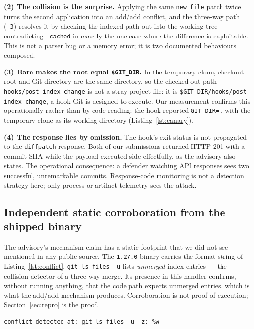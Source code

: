 \textbf{(2) The collision is the surprise.} Applying the same
\texttt{new file} patch twice turns the second application into an add/add
conflict, and the three-way path (\texttt{-3}) resolves it by checking the
indexed path out into the working tree --- contradicting \texttt{--cached} in
exactly the one case where the difference is exploitable. This is not a parser
bug or a memory error; it is two documented behaviours composed.

\textbf{(3) Bare makes the root equal \texttt{\$GIT\_DIR}.} In the temporary
clone, checkout root and Git directory are the same directory, so the
checked-out path \texttt{hooks/post-index-change} is not a stray project file:
it is \texttt{\$GIT\_DIR/hooks/post-index-change}, a hook Git is designed to
execute. Our measurement confirms this operationally rather than by code
reading: the hook reported \texttt{GIT\_DIR=.} with the temporary clone as its
working directory (Listing~\ref{lst:canary}).

\textbf{(4) The response lies by omission.} The hook's exit status is not
propagated to the \texttt{diffpatch} response. Both of our submissions returned
HTTP 201 with a commit SHA while the payload executed side-effectfully, as the
advisory also states. The operational consequence: a defender watching API
responses sees two successful, unremarkable commits. Response-code monitoring is
not a detection strategy here; only process or artifact telemetry sees the
attack.

\subsection{Independent static corroboration from the shipped binary}

The advisory's mechanism claim has a static footprint that we did not see
mentioned in any public source. The \texttt{1.27.0} binary carries the format
string of Listing~\ref{lst:conflict}. \texttt{git ls-files -u} lists
\emph{unmerged} index entries --- the collision detector of a three-way merge.
Its presence in this handler confirms, without running anything, that the code
path expects unmerged entries, which is what the add/add mechanism produces.
Corroboration is not proof of execution; Section~\ref{sec:repro} is the proof.

\begin{lstlisting}[style=transcript,
caption={Format string recovered from \texttt{/app/gitea/gitea} in the
\texttt{gitea/gitea:1.27.0} image (our measurement; not named in the advisory).
\texttt{git ls-files -u} is the unmerged-entry query of a three-way merge.},
label={lst:conflict}]
conflict detected at: git ls-files -u -z: %w
\end{lstlisting}

